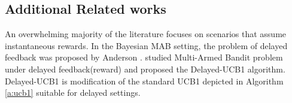 \subsection*{Additional Related works}
An overwhelming majority of the literature focuses on scenarios that assume instantaneous rewards.
In the Bayesian MAB setting, the problem of delayed feedback was proposed by Anderson \cite{Anderson1964}. \cite{joulani2013} studied Multi-Armed Bandit problem under delayed feedback(reward) and proposed the Delayed-UCB1 algorithm. Delayed-UCB1 is modification of the standard UCB1 depicted in Algorithm \ref{a:ucb1} suitable for delayed settings.


